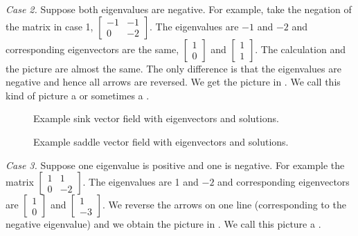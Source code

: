 \documentclass[12pt]{book}
\begin{document}
\emph{Case 2.} Suppose both eigenvalues are negative.  For example, take
the
negation of the matrix in case 1,
$\left[ \begin{smallmatrix} -1 & -1 \\ 0 & -2 \end{smallmatrix} \right]$.
The eigenvalues are $-1$ and $-2$ and corresponding eigenvectors are
the same,
$\left[ \begin{smallmatrix} 1 \\ 0 \end{smallmatrix} \right]$ and
$\left[ \begin{smallmatrix} 1 \\ 1 \end{smallmatrix} \right]$.  The
calculation and the picture are almost the same.  The only difference is that
the eigenvalues are negative and hence all arrows are reversed.  We get the
picture in .  We call this kind of picture a
\emph{} or sometimes a \emph{}.

\begin{figure}[h!t]
\begin{center}
\parbox[t]{3.1in}{
 \capstart
 \caption{Example sink vector field with eigenvectors and
 solutions.\label{pln:sink-fullfig}}
}
\quad
\parbox[t]{3.1in}{
 \capstart
 \caption{Example saddle vector field with eigenvectors and
 solutions.\label{pln:saddle-fullfig}}
}
\end{center}
\end{figure}

\medskip

\emph{Case 3.} Suppose one eigenvalue is positive and one is negative.
For example the matrix
$\left[ \begin{smallmatrix} 1 & 1 \\ 0 & -2 \end{smallmatrix} \right]$.
The eigenvalues are 1 and $-2$ and corresponding eigenvectors are
$\left[ \begin{smallmatrix} 1 \\ 0 \end{smallmatrix} \right]$ and
$\left[ \begin{smallmatrix} 1 \\ -3 \end{smallmatrix} \right]$.  We reverse
the arrows on one line (corresponding to the negative eigenvalue) and we
obtain the picture in .  We call this picture a
\emph{}.
\end{document}
